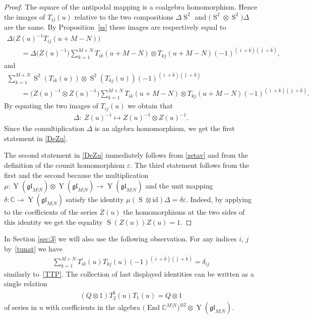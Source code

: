 \documentclass[10pt,a4paper]{amsart}
\numberwithin{equation}{section}
\def\bi{{\bar\imath }}
\def\bj{{\bar\jmath }}
\def\bk{{\bar k }}
\def\CC{{\mathbb{C}}}
\def\CMN{\CC^{M|N}}
\def\de{\delta}
\def\De{\Delta}
\def\End{\operatorname{End}}
\def\ep{\varepsilon}
\def\glMN{\mathfrak{gl}_{M|N}}
\def\id{{\mathrm{id}}}
\def\ot{\otimes}
\def\S{\operatorname{S}}
\def\TP{T^{\prime}}
\def\TS{T^{\sharp}}
\def\YMN{\operatorname{Y}(\glMN)}
\begin{document}
\begin{proof}
The square of the antipodal mapping is a coalgebra homomorphism.
Hence the images of
$T_{ij}(u)$ relative to the two compositions
$\De \S^{2}$ and $\big(\S^{2}\ot\S^{2}\big) \De$
are the same. By Proposition~\ref{ss} these images are respectively equal to
\begin{gather*}
\De \big( Z(u)^{-1} T_{ij}(u+M-N)\big)\\
\qquad {} = \De \big( Z(u)^{-1}\big) \sum_{k=1}^{M+N}
T_{ik}(u+M-N)\ot T_{kj}(u+M-N)
{(-1)}^{( \bi + \bk )( \bj + \bk )} ,
\end{gather*}
and
\begin{gather*}
\sum_{k=1}^{M+N}
\S^{2}( T_{ik}(u))\ot\S^{2}( T_{kj}(u))
{(-1)}^{( \bi + \bk )( \bj + \bk )}\\
\qquad{} =
\big( Z(u)^{-1}\ot Z(u)^{-1}\big)
\sum_{k=1}^{M+N}
T_{ik}(u+M-N)\ot T_{kj}(u+M-N)
{(-1)}^{( \bi + \bk )( \bj + \bk )} .
\end{gather*}
By equating the two images of $T_{ij}(u)$ we obtain that
\begin{gather*}
\De\colon \ Z(u)^{-1}\mapsto Z(u)^{-1}\ot Z(u)^{-1} .
\end{gather*}
Since the comultiplication $\De$ is an algebra homomorphism,
we get the first statement in \eqref{DeZu}.

The second statement in \eqref{DeZu} immediately follows from
\eqref{zetav} and from the definition of the counit homomorphism $\ep $.
The third statement follows from the first and the second because the
multiplication $\mu\colon \YMN\ot\YMN\to\YMN$ and the unit mapping
$\de\colon \CC\to\YMN$ satisfy the identity
$\mu (\S\ot\id) \De=\de \ep$. Indeed,
by applying to the coefficients of the series
$Z(u)$ the homomorphisms at the two sides of this identity we get the equality $\S(Z(u)) Z(u)=1 $.
\end{proof}

In Section \ref{sec:3} we will also use the following observation.
For any indices $i$, $j$ by~\eqref{tunat} we have
\begin{gather*}
\sum_{k=1}^{M+N} \TP_{ik}(u) T_{kj}(u)
{(-1)}^{( \bi + \bk )( \bj + \bk )}
=\delta_{ij}
\end{gather*}
similarly to~\eqref{TTP}.
The collection of last displayed identities can be written as a
single relation
\begin{gather}\label{QTT}
(Q\ot1) \TS_2(u) T_1(u)=Q\ot1
\end{gather}
of series in $u$ with coefficients in the algebra
$\big(\End\CMN\big)^{\ot 2}\ot\YMN $.
\end{document}
